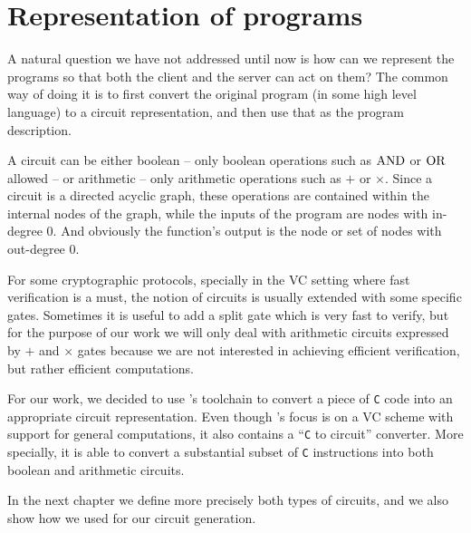 \section{Representation of programs}
A natural question we have not addressed until now is how can we represent the
programs so that both the client and the server can act on them? The common way
of doing it is to first convert the original program (in some high level
language) to a circuit representation, and then use that as the program
description. 

A circuit can be either boolean -- only boolean operations such as $\operatorname{AND}$ or
$\operatorname{OR}$ allowed -- or arithmetic -- only arithmetic operations such as $+$ or
$\times$. Since a circuit is a directed acyclic graph, these operations are
contained within the internal nodes of the graph, while the inputs of the
program are nodes with in-degree 0. And obviously the function's output is the
node or set of nodes with out-degree 0.

For some cryptographic protocols, specially in the VC setting where fast
verification is a must, the notion of circuits is usually extended with some
specific gates. Sometimes it is useful to add a split gate which is very fast
to verify, but for the purpose of our work we will only deal with arithmetic
circuits expressed by $+$ and $\times$ gates because we are not interested in
achieving efficient verification, but rather efficient computations.

For our work, we decided to use 's
\cite{parno:howell:gentry:raykova:2013} toolchain to convert a piece of
\texttt{C} code into an appropriate circuit representation. Even though
's focus is on a VC scheme with
support for general computations, it also contains a ``\texttt{C} to circuit''
converter. More specially, it is able to convert a substantial subset of
\texttt{C} instructions into both boolean and arithmetic circuits.


In the next chapter we define more precisely both types of circuits, and we
also show how we used  for our
circuit generation.
